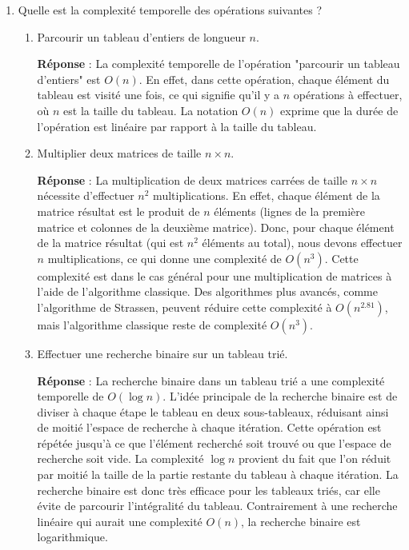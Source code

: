 \begin{enumerate}
	\item Quelle est la complexité temporelle des opérations suivantes ?
	\begin{enumerate}
		\item Parcourir un tableau d'entiers de longueur $n$.
		
		\textbf{Réponse} : 
		La complexité temporelle de l'opération "parcourir un tableau d'entiers" est $O(n)$. En effet, dans cette opération, chaque élément du tableau est visité une fois, ce qui signifie qu'il y a $n$ opérations à effectuer, où $n$ est la taille du tableau. La notation $O(n)$ exprime que la durée de l'opération est linéaire par rapport à la taille du tableau.
		
		\item Multiplier deux matrices de taille $n \times n$.
		
		\textbf{Réponse} : 
		La multiplication de deux matrices carrées de taille $n \times n$ nécessite d'effectuer $n^2$ multiplications. En effet, chaque élément de la matrice résultat est le produit de $n$ éléments (lignes de la première matrice et colonnes de la deuxième matrice). Donc, pour chaque élément de la matrice résultat (qui est $n^2$ éléments au total), nous devons effectuer $n$ multiplications, ce qui donne une complexité de $O(n^3)$. 
		Cette complexité est dans le cas général pour une multiplication de matrices à l'aide de l'algorithme classique. Des algorithmes plus avancés, comme l'algorithme de Strassen, peuvent réduire cette complexité à $O(n^{2.81})$, mais l'algorithme classique reste de complexité $O(n^3)$.
		
		\item Effectuer une recherche binaire sur un tableau trié.
		
		\textbf{Réponse} : 
		La recherche binaire dans un tableau trié a une complexité temporelle de $O(\log n)$. L'idée principale de la recherche binaire est de diviser à chaque étape le tableau en deux sous-tableaux, réduisant ainsi de moitié l'espace de recherche à chaque itération. Cette opération est répétée jusqu'à ce que l'élément recherché soit trouvé ou que l'espace de recherche soit vide. 
		La complexité $\log n$ provient du fait que l'on réduit par moitié la taille de la partie restante du tableau à chaque itération. La recherche binaire est donc très efficace pour les tableaux triés, car elle évite de parcourir l'intégralité du tableau. Contrairement à une recherche linéaire qui aurait une complexité $O(n)$, la recherche binaire est logarithmique.
		

\end{enumerate}
\end{enumerate}
